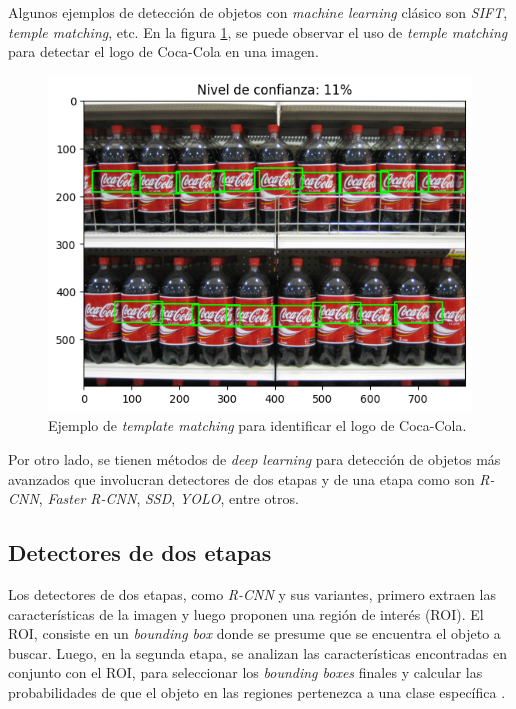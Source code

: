 Algunos ejemplos de detección de objetos con \textit{machine learning} clásico son \textit{SIFT}, \textit{temple matching}, etc. En la figura \ref{fig:tempMatch}, se puede observar el uso de \textit{temple matching} para detectar el logo de Coca-Cola en una imagen.

\begin{figure}[ht]
	\centering
	\includegraphics[scale=.45]{./Figures/template_match.png}
	\caption{Ejemplo de \textit{template matching} para identificar el logo de Coca-Cola.}
	\label{fig:tempMatch}
\end{figure}

Por otro lado, se tienen métodos de \textit{deep learning} para detección de objetos más avanzados que involucran detectores de dos etapas y de una etapa como son \textit{R-CNN}, \textit{Faster R-CNN}, \textit{SSD}, \textit{YOLO}, entre otros.

\subsection{Detectores de dos etapas}

Los detectores de dos etapas, como \textit{R-CNN} y sus variantes, primero extraen las características de la imagen y luego proponen una región de interés (ROI). El ROI, consiste en un \textit{bounding box} donde se presume que se encuentra el objeto a buscar. Luego, en la segunda etapa, se analizan las características encontradas en conjunto con el ROI, para seleccionar los \textit{bounding boxes} finales y calcular las probabilidades de que el objeto en las regiones pertenezca a una clase específica \cite{ARTICLE:8}. 


